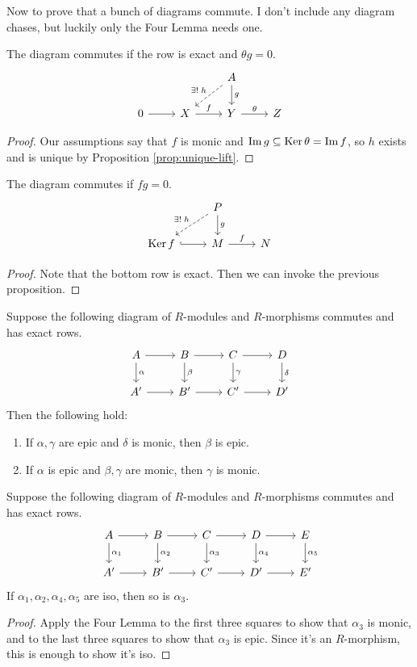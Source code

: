 \documentclass[twoside,10pt]{report}
\begin{document}
Now to prove that a bunch of diagrams commute. I don't include any diagram chases, but luckily only the Four Lemma needs one.
\begin{prop}
The diagram commutes if the row is exact and $\theta g = 0$.
\[
\begin{tikzcd}
	& & A \arrow[dl, dashed, "\exists! \;h"'] \dar{g} \\
	0 \rar & X \rar{f} & Y \rar{\theta} & Z
\end{tikzcd}
\] 
\end{prop}
\begin{proof}
	Our assumptions say that $f$ is monic and $\operatorname{Im} g \subseteq \operatorname{Ker} \theta = \operatorname{Im} f$, so $h$ exists and is unique by Proposition \ref{prop:unique-lift}.
\end{proof}

\begin{cor}
The diagram commutes if $fg=0$.
\[
\begin{tikzcd}
	& P \arrow[dl, dashed, "\exists!\;h"'] \dar{g} \\
	\ker f \rar[hook] & M \rar{f} & N
\end{tikzcd}
\] 
\end{cor}
\begin{proof}
	Note that the bottom row is exact. Then we can invoke the previous proposition.
\end{proof}

\begin{thrm}
Suppose the following diagram of $R$-modules and $R$-morphisms commutes and has exact rows.
\[
\begin{tikzcd}
	A \rar\dar{\alpha} & B \rar\dar{\beta} & C\rar\dar{\gamma} & D\dar{\delta} \\
	A'\rar & B'\rar & C'\rar & D'
\end{tikzcd}
\] Then the following hold:
\begin{enumerate}
	\item If $\alpha,\gamma$ are epic and $\delta$ is monic, then $\beta$ is epic.
	\item If $\alpha$ is epic and $\beta,\gamma$ are monic, then $\gamma$ is monic.
\end{enumerate}
\end{thrm}

\begin{thrm}
Suppose the following diagram of $R$-modules and $R$-morphisms commutes and has exact rows.
\[
\begin{tikzcd}
	A\rar\dar{\alpha_1} & B\rar\dar{\alpha_2} & C\rar\dar{\alpha_3} & D\rar\dar{\alpha_4} & E\dar{\alpha_5} \\
	A'\rar & B'\rar & C'\rar & D'\rar & E'
\end{tikzcd}
\] 
If $\alpha_1,\alpha_2,\alpha_4,\alpha_5$ are iso, then so is $\alpha_3$.
\end{thrm}
\begin{proof}
	Apply the Four Lemma to the first three squares to show that $\alpha_3$ is monic, and to the last three squares to show that $\alpha_3$ is epic. Since it's an $R$-morphism, this is enough to show it's iso.
\end{proof}
\end{document}
